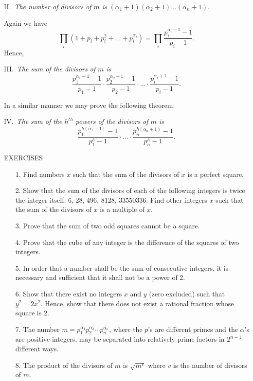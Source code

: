 \documentclass[oneside]{book}
\begin{document}
\smallskip II.~\emph{The number of divisors of $m$ is}
$(\alpha_1 + 1) (\alpha_2 + 1) \ldots (\alpha_n+1)$.

Again we have
\begin{equation*}
\prod_i(1 + p_i + p_i^2 + \ldots + p_i^{\alpha_i}) =
  \prod_i\frac{p_i^{\alpha_i+1} - 1}{p_i - 1}.
\end{equation*}
Hence,

\smallskip III.~\emph{The sum of the divisors of $m$ is}
\begin{equation*}
\frac{p_1^{\alpha_1 + 1} - 1}{p_1 - 1} \cdot
    \frac{p_2^{\alpha_2 + 1} - 1}{p_2 - 1} \cdot
    \ldots \cdot
    \frac{p_i^{\alpha_i + 1} - 1}{p_i - 1}.
\end{equation*}

In a similar manner we may prove the following theorem:

\smallskip IV.~\emph{The sum of the $h^{th}$ powers of the divisors
of $m$ is}
\begin{equation*}
\frac{p_1^{h(\alpha_1 + 1)} - 1}{p_1^h - 1} \cdot
    \ldots \cdot
    \frac{p_n^{h(\alpha_n + 1)} - 1}{p_n^h - 1}.
\end{equation*}

\begin{center}
EXERCISES
\end{center}

\small \begin{enumerate}
\item[1.] Find numbers $x$ such that the sum of the divisors of $x$
is a perfect square.

\item[2.] Show that the sum of the divisors of each of the following
integers is twice the integer itself: 6, 28, 496, 8128, 33550336.
Find other integers $x$ such that the sum of the divisors of $x$ is
a multiple of $x$.

\item[3.] Prove that the sum of two odd squares cannot be a square.

\item[4.] Prove that the cube of any integer is the difference of the
squares of two integers.

\item[5.] In order that a number shall be the sum of consecutive
integers, it is necessary and sufficient that it shall not be a
power of 2.

\item[6.] Show that there exist no integers $x$ and $y$ (zero excluded)
such that $y^2 = 2x^2$. Hence, show that there does not exist a
rational fraction whose square is 2.

\item[7.] The number $m = p_1^{\alpha_1} p_2^{\alpha_2} \cdots
p_n^{\alpha_n}$, where the $p$'s are different primes and the
$\alpha$'s are positive integers, may be separated into relatively
prime factors in $2^{n-1}$ different ways.

\item[8.] The product of the divisors of $m$ is $\sqrt{m^v}$ where $v$
is the number of divisors of $m$.
\end{enumerate} \normalsize{}
\end{document}
